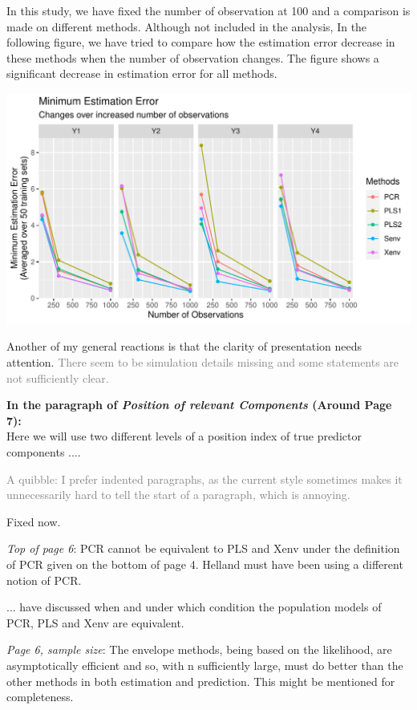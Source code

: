 \documentclass[12pt, a4paper]{scrartcl}
\begin{document}
\textcolor{answers}{In this study, we have fixed the number of observation at 100 and a comparison is made on different methods. Although not included in the analysis, In the following figure, we have tried to compare how the estimation error decrease in these methods when the number of observation changes. The figure shows a significant decrease in estimation error for all methods.}

\includegraphics[width=\textwidth]{n-vs-est-err.pdf}

Another of my general reactions is that the clarity of presentation needs attention. \textcolor{gray}{There seem to be simulation details missing and some statements are not sufficiently clear.} 

\textcolor{answers}{\textcolor{mycolor1}{\textbf{In the paragraph of \textit{Position of relevant Components} (Around Page 7): }}\\
Here we will use two different levels of a position index of true predictor components ...}. 

\textcolor{gray}{A quibble:
I prefer indented paragraphs, as the current style sometimes makes it unnecessarily hard to tell the start of a paragraph, which is annoying.}

\textcolor{answers}{Fixed now.}

\textit{Top of page 6}: PCR cannot be equivalent to PLS and Xenv under the definition of PCR given on the bottom of page 4. Helland must have been using a different notion of PCR.

\textcolor{answers}{\textcolor{answers}{... have discussed when and under which condition the population models of PCR, PLS and Xenv are equivalent.}}

\textit{Page 6, sample size}: The envelope methods, being based on the likelihood, are asymptotically efficient and so, with n sufficiently large, must do better than the other methods in both
estimation and prediction. This might be mentioned for completeness.
\end{document}
